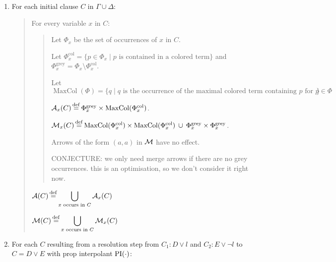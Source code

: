 \documentclass[,%
	paper=a4,%
	DIV14, %
	twoside=false,%
	liststotoc,
	bibtotoc,
	draft=false,%
	numbers=noendperiod
]{scrartcl}
\begin{document}
\newcommand{\Phicol}{\Phi^{\operatorname{col}}}
\newcommand{\Phigrey}{\Phi^{\operatorname{grey}}}
\newcommand{\MaxCol}{\operatorname{MaxCol}}
\begin{enumerate}
	\item For each initial clause $C$ in $\Gamma \cup \Delta$:

		\begin{quote}
			For every variable $x$ in $C$:

			\begin{quote}

				Let $\Phi_x$ be the set of occurrences of $x$ in $C$. 

				Let $\Phicol_x = \{p \in \Phi_x \mid \text{$p$ is contained in a colored term} \}$
				and $\Phigrey_x = \Phi_x \setminus \Phicol_x$.

				Let $\MaxCol(\Phi) = \{q \mid \text{$q$ is the occurrence of the maximal colored term containing $p$ for $p \in \Phi$} \}$

				$\arr_x(C) \defeq \Phigrey_x \times \MaxCol(\Phicol_x)$. 


				$\warr_x(C) \defeq \MaxCol(\Phicol_x) \times \MaxCol(\Phicol_x) \spam\cup
				\Phigrey_x\times\Phigrey_x$. 

				Arrows of the form $(a, a)$ in $\operatorname{\operatorname{\mathcal{M}}}$ have no effect.

				CONJECTURE: we only need merge arrows if  there are no grey occurrences. this is an optimisation, so we don't consider it right now.
			\end{quote}

			$\operatorname{\mathcal{A}}(C) \operatorname{\stackrel{\mathrm{def}}{=}}\displaystyle \bigcup_{ x \text{ occurs in }C} \operatorname{\mathcal{A}}_x(C)$

			$\operatorname{\operatorname{\mathcal{M}}}(C) \operatorname{\stackrel{\mathrm{def}}{=}}\displaystyle \bigcup_{x \text{ occurs in }C} \operatorname{\operatorname{\mathcal{M}}}_x(C)$
		\end{quote}



	\item 
		For each $C$ resulting from a resolution step from $C_1: D\lor l$ and $C_2: E\lor \lnot l$ to $C = D \lor E$ with prop interpolant $\operatorname{PI}(\cdot)$:


\end{enumerate}
\end{document}

